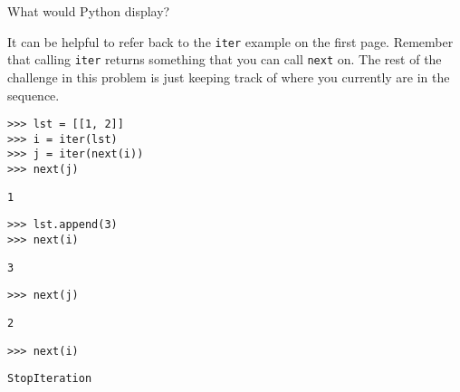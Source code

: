\question What would Python display?
\setlength{\medskipamount}{0pt}

\begin{solution}
It can be helpful to refer back to the \texttt{iter} example on the first page.
Remember that calling \texttt{iter} returns something that you can call
\texttt{next} on. The rest of the challenge in this problem is just keeping
track of where you currently are in the sequence.
\end{solution}
\begin{lstlisting}
>>> lst = [[1, 2]]
>>> i = iter(lst)
>>> j = iter(next(i))
>>> next(j)
\end{lstlisting}
\begin{solution}[0.2in]
\begin{lstlisting}
1
\end{lstlisting}
\end{solution}

\begin{lstlisting}
>>> lst.append(3)
>>> next(i)
\end{lstlisting}
\begin{solution}[0.2in]
\begin{lstlisting}
3
\end{lstlisting}
\end{solution}

\begin{lstlisting}
>>> next(j)
\end{lstlisting}
\begin{solution}[0.2in]
\begin{lstlisting}
2
\end{lstlisting}
\end{solution}

\begin{lstlisting}
>>> next(i)
\end{lstlisting}
\begin{solution}[0.2in]
\begin{lstlisting}
StopIteration
\end{lstlisting}
\end{solution}

